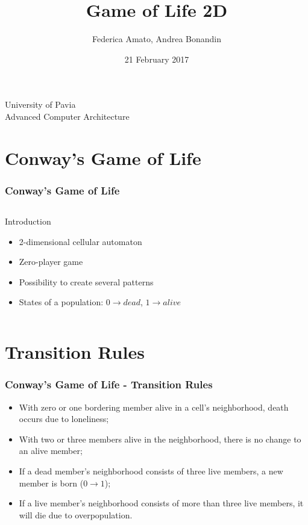 \documentclass{beamer}
\begin{document}
\title{Game of Life 2D}
\author{Federica Amato, Andrea Bonandin}
\date{21 February 2017}

\begin{frame}
	\begin{center}
		\Large{University of Pavia \\
		Advanced Computer Architecture}
	\end{center}
	\titlepage
\end{frame}

\section{Conway's Game of Life}
\begin{frame}
	\frametitle{Conway's Game of Life}
	\begin{columns}
		\begin{block}{Introduction}
			\begin{itemize}
				\item 2-dimensional cellular automaton
				\item Zero-player game
				\item Possibility to create several patterns
				\item States of a population: $0 \rightarrow dead$, $1 \rightarrow alive$
			\end{itemize}
		\end{block}
	\end{columns}
\end{frame}

\section{Transition Rules}
\begin{frame}
	\frametitle{Conway's Game of Life - Transition Rules}
	\begin{itemize}
		\item With zero or one bordering member alive in a cell's neighborhood, death occurs due to loneliness;
		\item With two or three members alive in the neighborhood, there is no change to an alive member;
		\item If a dead member's neighborhood consists of three live members, a new member is born ($0 \rightarrow 1$);
		\item If a live member's neighborhood consists of more than three live members, it will die due to overpopulation.
	\end{itemize}
\end{frame}
\end{document}
